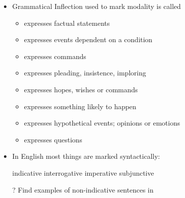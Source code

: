 \documentclass[a4paper,landscape,headrule,footrule,xetex]{foils}
\begin{document}
\begin{itemize}
\item Grammatical Inflection used to mark modality is called 
  \begin{itemize}
  \item {} expresses factual statements
  \item {} expresses events dependent on a condition
  \item {} expresses commands
  \item {} expresses pleading, insistence, imploring
  \item {} expresses hopes, wishes or commands 
  \item {} expresses something likely to happen
  \item {} expresses  hypothetical events; opinions or emotions
  \item {} expresses questions
\end{itemize}
\item In English most things are marked syntactically: \vspace*{-1ex}
    \begin{exe}
      \ex  {}  \hfill indicative
      \ex  {} \hfill interrogative
    \ex {} \hfill imperative
    \ex {} \hfill subjunctive
  \end{exe}
\item [?] Find examples of non-indicative sentences in \Story{}\task
\end{itemize}

\newcommand{\TIPA}[1]{\textipa{\mtcitestyle{#1}}}
\end{document}
